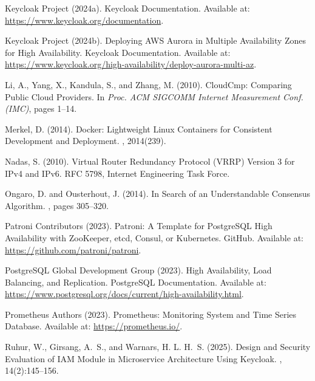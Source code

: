 \documentclass[a4paper,twoside]{article}
\begin{document}
\begin{thebibliography}{}
Keycloak Project (2024a).
\newblock Keycloak Documentation.
\newblock Available at: \url{https://www.keycloak.org/documentation}.

Keycloak Project (2024b).
\newblock Deploying AWS Aurora in Multiple Availability Zones for High Availability.
\newblock Keycloak Documentation.
\newblock Available at: \url{https://www.keycloak.org/high-availability/deploy-aurora-multi-az}.

Li, A., Yang, X., Kandula, S., and Zhang, M. (2010).
\newblock CloudCmp: Comparing Public Cloud Providers.
\newblock In {\em Proc. ACM SIGCOMM Internet Measurement Conf. (IMC)}, pages 1--14.

Merkel, D. (2014).
\newblock Docker: Lightweight Linux Containers for Consistent Development and Deployment.
, 2014(239).

Nadas, S. (2010).
\newblock Virtual Router Redundancy Protocol (VRRP) Version 3 for IPv4 and IPv6.
\newblock RFC 5798, Internet Engineering Task Force.

Ongaro, D. and Ousterhout, J. (2014).
\newblock In Search of an Understandable Consensus Algorithm.
, pages 305--320.

Patroni Contributors (2023).
\newblock Patroni: A Template for PostgreSQL High Availability with ZooKeeper, etcd, Consul, or Kubernetes.
\newblock GitHub.
\newblock Available at: \url{https://github.com/patroni/patroni}.

PostgreSQL Global Development Group (2023).
\newblock High Availability, Load Balancing, and Replication.
\newblock PostgreSQL Documentation.
\newblock Available at: \url{https://www.postgresql.org/docs/current/high-availability.html}.

Prometheus Authors (2023).
\newblock Prometheus: Monitoring System and Time Series Database.
\newblock Available at: \url{https://prometheus.io/}.

Ruhur, W., Girsang, A.~S., and Warnars, H. L. H.~S. (2025).
\newblock Design and Security Evaluation of IAM Module in Microservice Architecture Using Keycloak.
, 14(2):145--156.


\end{thebibliography}
\end{document}
